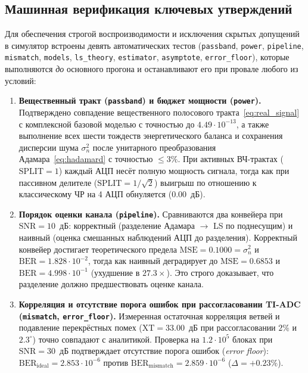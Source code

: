 \documentclass[a4paper,12pt]{article}
\numberwithin{equation}{section}
\newcommand{\BER}{\mathrm{BER}}
\newcommand{\SNR}{\mathrm{SNR}}
\begin{document}
\subsection{Машинная верификация ключевых утверждений}
Для обеспечения строгой воспроизводимости и исключения скрытых допущений в симулятор встроены девять автоматических тестов (\texttt{passband}, \texttt{power}, \texttt{pipeline}, \texttt{mismatch}, \texttt{models}, \texttt{ls\_theory}, \texttt{estimator}, \texttt{asymptote}, \texttt{error\_floor}), которые выполняются \emph{до} основного прогона и останавливают его при провале любого из условий:

\begin{enumerate}
\item \textbf{Вещественный тракт (\texttt{passband}) и бюджет мощности (\texttt{power}).} Подтверждено совпадение вещественного полосового тракта~\eqref{eq:real_signal} с комплексной базовой моделью с точностью до $4.49\cdot10^{-13}$, а также выполнение всех шести тождеств энергетического баланса и сохранения дисперсии шума $\sigma_n^2$ после унитарного преобразования Адамара~\eqref{eq:hadamard} с точностью $\le 3\%$. При активных ВЧ-трактах ($\text{SPLIT}=1$) каждый АЦП несёт полную мощность сигнала, тогда как при пассивном делителе ($\text{SPLIT}=1/\sqrt{2}$) выигрыш по отношению к классическому ЧР на 4 АЦП обнуляется ($0.00$~дБ).

\item \textbf{Порядок оценки канала (\texttt{pipeline}).} Сравниваются два конвейера при $\SNR=10$~дБ: корректный (разделение Адамара $\to$ LS по поднесущим) и наивный (оценка смешанных наблюдений АЦП до разделения). Корректный конвейер достигает теоретического предела $\text{MSE} = 0.1000 = \sigma_n^2$ и $\BER = 1.828\cdot10^{-2}$, тогда как наивный деградирует до $\text{MSE} = 0.6853$ и $\BER = 4.998\cdot10^{-1}$ (ухудшение в $\mathbf{27.3\times}$). Это строго доказывает, что разделение должно предшествовать оценке канала.

\item \textbf{Корреляция и отсутствие порога ошибок при рассогласовании TI-ADC (\texttt{mismatch}, \texttt{error\_floor}).} Измеренная остаточная корреляция ветвей и подавление перекрёстных помех ($\text{XT} = 33.00$~дБ при рассогласовании $2\%$ и $2.3^\circ$) точно совпадают с аналитикой. Проверка на $1.2\cdot10^5$ блоках при $\SNR = 30$~дБ подтверждает отсутствие порога ошибок (\emph{error floor}): $\BER_{\text{ideal}} = 2.853\cdot10^{-6}$ против $\BER_{\text{mismatch}} = 2.859\cdot10^{-6}$ ($\Delta = +0.23\%$).


\end{enumerate}
\end{document}
